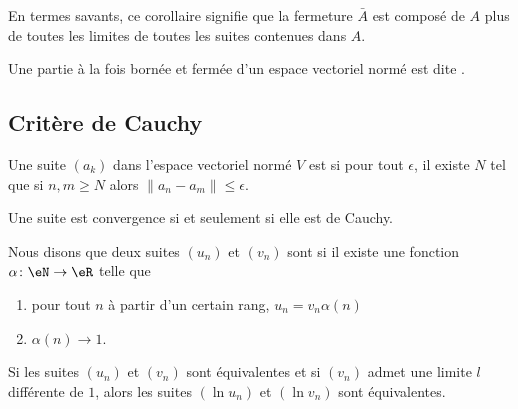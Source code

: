 En termes savants, ce corollaire signifie que la fermeture $\bar A$ est composé de $A$ plus de toutes les limites de toutes les suites contenues dans $A$.

\begin{definition}
	Une partie à la fois bornée et fermée d'un espace vectoriel normé est dite .
\end{definition}

\subsection{Critère de Cauchy}

\begin{definition}
    Une suite \( (a_k)\) dans l'espace vectoriel normé \( V\) est  si pour tout \( \epsilon\), il existe \( N\) tel que si \( n,m\geq N\) alors \( \| a_n-a_m \|\leq \epsilon\).
\end{definition}

\begin{theorem}  \label{ThoHGyzAva}
    Une suite est convergence si et seulement si elle est de Cauchy.
\end{theorem}

\begin{definition}
    Nous disons que deux suites \( (u_n)\) et \( (v_n)\) sont  si il existe une fonction \( \alpha\colon \eN\to \eR\) telle que
    \begin{enumerate}
        \item
            pour tout \( n\) à partir d'un certain rang, \( u_n=v_n\alpha(n)\)
        \item
            \( \alpha(n)\to 1\).
    \end{enumerate}
\end{definition}

\begin{lemma}
    Si les suites \( (u_n)\) et \( (v_n)\) sont équivalentes et si \( (v_n)\) admet une limite \( l\) différente de \( 1\), alors les suites \( (\ln u_n)\) et \( (\ln v_n)\) sont équivalentes.
\end{lemma}

